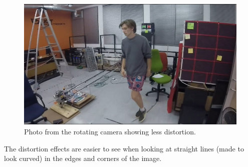 \begin{figure}[h!]
  \centering
  \includegraphics[width=\textwidth]{results/less_distorted_gopro}
  \caption{\label{fig:less_distorted_gopro}Photo from the rotating camera showing less distortion.}
\end{figure}

The distortion effects are easier to see when looking at straight lines (made to look curved) in the edges and corners of the image.




